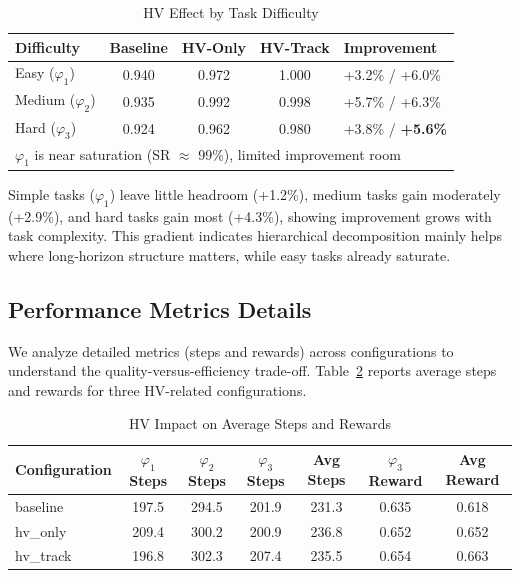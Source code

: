 \documentclass{article}
\begin{document}
\begin{table}[t]
\centering
\caption{HV Effect by Task Difficulty}
\label{tab:difficulty_impact}
\begin{tabular}{@{}lcccl@{}}
\toprule
\textbf{Difficulty} & \textbf{Baseline} & \textbf{HV-Only} & \textbf{HV-Track} & \textbf{Improvement} \\ \midrule
Easy ($\varphi_1$) & 0.940 & 0.972 & 1.000 & +3.2\% / +6.0\% \\
Medium ($\varphi_2$) & 0.935 & 0.992 & 0.998 & +5.7\% / +6.3\% \\
Hard ($\varphi_3$) & 0.924 & 0.962 & 0.980 & +3.8\% / \textbf{+5.6\%} \\ \bottomrule
\multicolumn{5}{l}{\footnotesize *$\varphi_1$ is near saturation (SR $\approx$ 99\%), limited improvement room}
\end{tabular}
\end{table}

Simple tasks ($\varphi_1$) leave little headroom (+1.2\%), medium tasks gain moderately (+2.9\%), and hard tasks gain most (+4.3\%), showing improvement grows with task complexity. This gradient indicates hierarchical decomposition mainly helps where long-horizon structure matters, while easy tasks already saturate.

\subsection{Performance Metrics Details}

We analyze detailed metrics (steps and rewards) across configurations to understand the quality-versus-efficiency trade-off. Table~\ref{tab:hv-steps-rewards} reports average steps and rewards for three HV-related configurations.

\begin{table}[t]
\centering
\caption{HV Impact on Average Steps and Rewards}
\label{tab:hv-steps-rewards}
\begin{tabular}{@{}lcccccc@{}}
\toprule
\textbf{Configuration} & \textbf{$\varphi_1$ Steps} & \textbf{$\varphi_2$ Steps} & \textbf{$\varphi_3$ Steps} & \textbf{Avg Steps} & \textbf{$\varphi_3$ Reward} & \textbf{Avg Reward} \\ \midrule
baseline & 197.5 & 294.5 & 201.9 & 231.3 & 0.635 & 0.618 \\
hv\_only & 209.4 & 300.2 & 200.9 & 236.8 & 0.652 & 0.652 \\
hv\_track & 196.8 & 302.3 & 207.4 & 235.5 & 0.654 & 0.663 \\ \bottomrule
\end{tabular}
\end{table}
\end{document}
